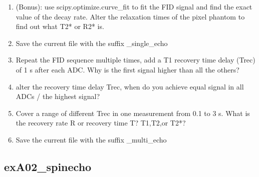 \documentclass[a4paper,12pt]{extarticle}
\begin{document}
\begin{enumerate}
\item  (Bonus): use scipy.optimize.curve\_fit to fit the FID signal and find the exact value of the decay rate. Alter the relaxation times of the pixel phantom to find out what T2* or R2* is.

\item Save the current file with the suffix \_single\_echo
	
\item  	Repeat the FID sequence multiple times, add a T1 recovery time delay (Trec) of 1 s after each ADC. Why is the first signal higher than all the others?

\item 	alter the recovery time delay Trec, when do you achieve equal signal in all ADCs / the highest signal?

\item	Cover a range of different Trec in one measurement from 0.1 to 3 s. What is the recovery rate R or recovery time T? T1,T2,or T2*?  

\item Save the current file with the suffix \_multi\_echo

\end{enumerate}

\newpage
\subsection{exA02\_spinecho}
\end{document}
